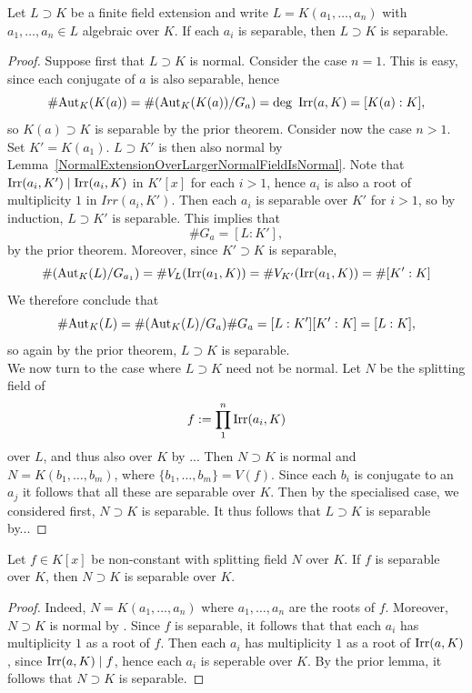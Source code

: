 \begin{lemma}
    Let $L\supset K$ be a finite field extension and write $L=K(a_1,\dots,a_n)$ with $a_1,\dots,a_n\in L$ algebraic over $K$. If each $a_i$ is separable, then $L\supset K$ is separable. 
\end{lemma}
\begin{proof}
    Suppose first that $L\supset K$ is normal. Consider the case $n=1$. This is easy, since each conjugate of $a$ is also separable, hence 
    $$
        \#\mathrm{Aut}_K(K(a)) = \#(\mathrm{Aut}_K(K(a))/G_a) = \deg\ \mathrm{Irr}(a,K) = [K(a):K],
    $$
    so $K(a)\supset K$ is separable by the prior theorem. Consider now the case $n>1$. Set $K' = K(a_1)$. $L\supset K'$ is then also normal by Lemma~\ref{NormalExtensionOverLargerNormalFieldIsNormal}. Note that $\mathrm{Irr}(a_i,K')\mid \mathrm{Irr}(a_i,K)$ in $K'[x]$ for each $i>1$, hence $a_i$ is also a root of multiplicity $1$ in $Irr(a_i,K')$. Then each $a_i$ is separable over $K'$ for $i>1$, so by induction, $L\supset K'$ is separable. This implies that 
    $$
        \# G_a = [L:K'],
    $$
    by the prior theorem. 
    Moreover, since $K'\supset K$ is separable,  
    $$
        \#(\mathrm{Aut}_K(L)/G_{a_1}) = \#V_L(\mathrm{Irr}(a_1,K))=\#V_{K'}(\mathrm{Irr}(a_1,K)) = \# [K':K] 
    $$
    We therefore conclude that 
    $$
        \#\mathrm{Aut}_{K}(L) = \#(\mathrm{Aut}_K(L)/G_a) \#G_a = [L:K'][K':K] = [L:K],
    $$
    so again by the prior theorem, $L\supset K$ is separable.\\
    We now turn to the case where $L\supset K$ need not be normal. Let $N$ be the splitting field of 
    $$
        f := \prod_1^n \mathrm{Irr}(a_i,K)
    $$
    over $L$, and thus also over $K$ by ... Then $N\supset K$ is normal and $N = K(b_1,\dots,b_m)$, where 
    $\{b_1,\dots,b_m\} = V(f).$ Since each $b_i$ is conjugate to an $a_j$ it follows that all these are separable over $K$. Then by the specialised case, we considered first, $N\supset K$ is separable. It thus follows that $L\supset K$ is separable by...    
\end{proof}

\begin{corollary}
    Let $f\in K[x]$ be non-constant with splitting field $N$ over $K$. If $f$ is separable over $K$, then $N\supset K$ is separable over $K$. 
\end{corollary}
\begin{proof}
    Indeed, $N=K(a_1,\dots,a_n)$ where $a_1,\dots,a_n$ are the roots of $f$. Moreover, $N\supset K$ is normal by . Since $f$ is separable, it follows that that each $a_i$ has multiplicity $1$ as a root of $f$. Then each $a_i$ has multiplicity $1$ as a root of $\mathrm{Irr}(a,K)$, since $\mathrm{Irr}(a,K)\mid f$, hence each $a_i$ is seperable over $K$. By the prior lemma, it follows that $N\supset K $ is separable. 
\end{proof}

